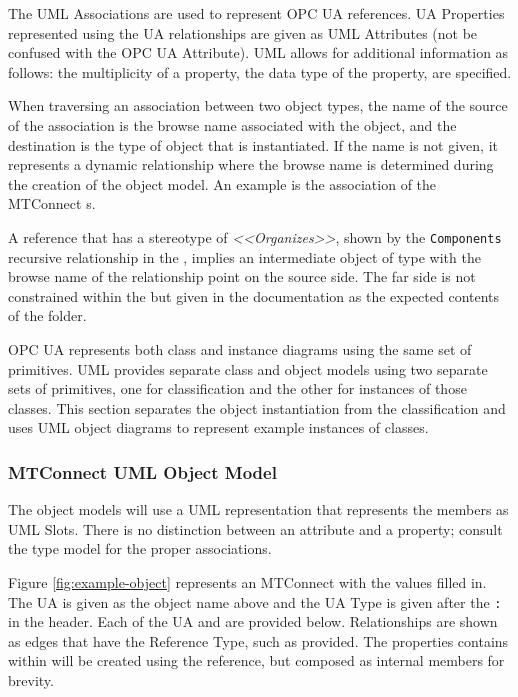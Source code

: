The UML Associations are used to represent OPC UA references. UA Properties represented using the UA  relationships are given as UML Attributes (not be confused with the OPC UA Attribute). UML allows for additional information as follows:  the multiplicity of a property, the data type of the property, are specified.


\FloatBarrier

When traversing an association between two object types, the name of the source of the association is the browse name associated with the object, and the destination is the type of object that is instantiated. If the name is not given, it represents a dynamic relationship where the browse name is determined during the creation of the object model. An example is the association of the MTConnect s.


\FloatBarrier

A reference that has a stereotype of \textit{<<Organizes>>}, shown by the \texttt{Components} recursive relationship in the , implies an intermediate object of type  with the browse name of the relationship point on the source side. The far side is not constrained within the  but given in the documentation as the expected contents of the folder.

OPC UA represents both class and instance diagrams using the same set of primitives. UML provides separate class and object models using two separate sets of primitives, one for classification and the other for instances of those classes. This section separates the object instantiation from the classification and uses UML object diagrams to represent example instances of classes.

\FloatBarrier

\subsubsection{MTConnect UML Object Model}

The object models will use a UML representation that represents the members as UML Slots. There is no distinction between an attribute and a property; consult the type model for the proper associations.



Figure \ref{fig:example-object} represents an MTConnect  with the values filled in. The UA  is given as the object name above and the UA Type is given after the \texttt{:} in the header. Each of the UA  and  are provided below. Relationships are shown as edges that have the Reference Type, such as  provided. The properties contains within will be created using the  reference, but composed as internal members for brevity.

